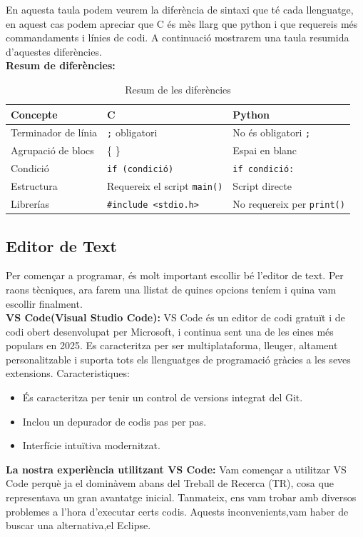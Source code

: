 En aquesta taula podem veurem la diferència de sintaxi que té cada llenguatge, en aquest cas podem apreciar que C és mès llarg que python i que requereis més commandaments i línies de codi. A continuació mostrarem una taula resumida d'aquestes diferències.
\\

\textbf{Resum de diferències:}
\begin{table}[h!]
\centering
\begin{tabular}{|l|l|l|}
\hline
\textbf{Concepte} & \textbf{C} & \textbf{Python} \\
\hline
Terminador de línia & \verb|;| obligatori & No és obligatori \verb|;| \\
\hline
Agrupació de blocs & \{ \} & Espai en blanc \\
\hline
Condició & \verb|if (condició)| & \verb|if condició:| \\
\hline
Estructura & Requereix el script \verb|main()| & Script directe \\
\hline
Librerías & \verb|#include <stdio.h>| & No requereix per \verb|print()| \\
\hline
\end{tabular}
\caption{Resum de les diferències}
\end{table}

\subsection{Editor de Text}
Per començar a programar, és molt important escollir bé l'editor de text. Per raons tècniques, ara farem una llistat de quines opcions teníem i quina vam escollir finalment. \\

\textbf{VS Code(Visual Studio Code):}
VS Code és un editor de codi gratuït i de codi obert desenvolupat per Microsoft, i continua sent una de les eines més populars en 2025. Es caracteritza per ser multiplataforma, lleuger, altament personalitzable i suporta tots els llenguatges de programació gràcies a les seves extensions.
Caracteristiques:
\begin{itemize}
 \item És caracteritza per tenir un control de versions integrat del Git.
 \item Inclou un depurador de codis pas per pas.
 \item Interfície intuïtiva modernitzat.
\end{itemize}
\textbf{La nostra experiència utilitzant VS Code:}
Vam començar a utilitzar VS Code perquè ja el dominàvem abans del Treball de Recerca (TR), cosa que representava un gran avantatge inicial. Tanmateix, ens vam trobar amb diversos problemes a l'hora d'executar certs codis. Aquests inconvenients,vam haber de buscar una alternativa,el Eclipse. \\

